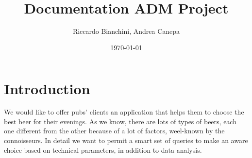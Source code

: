 \documentclass{article}
\title{Documentation ADM Project}
\author{Riccardo Bianchini, Andrea Canepa}
\date{\today}
\begin{document}
\maketitle
\tableofcontents
\newpage


\section{Introduction}
We would like to offer pubs' clients an application that helps them to choose
the best beer for their evenings. As we know, there are lots of types of
beers, each one different from the other because of a lot of factors,
weel-known by the connoisseurs. In detail we want to permit a smart set of
queries to make an aware choice based on technical parameters, in addition to
data analysis.
\end{document}
